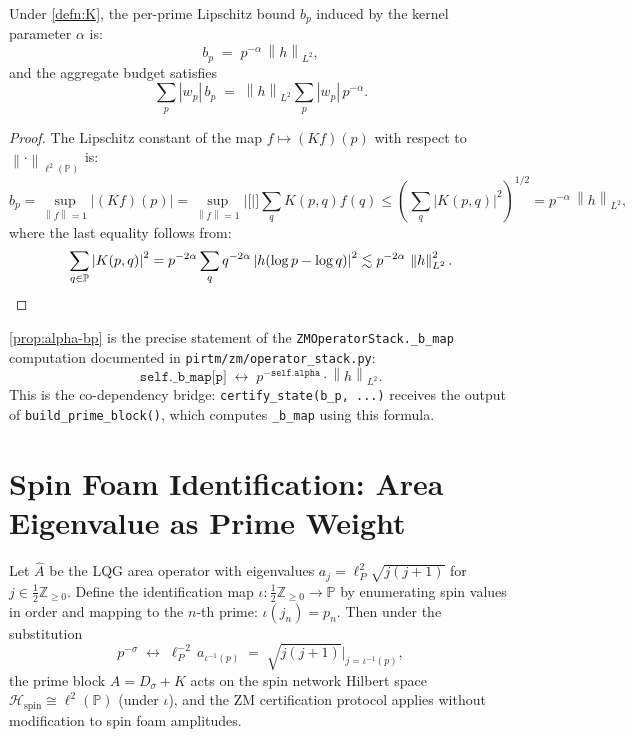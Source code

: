 \documentclass[12pt,letterpaper]{article}
\theoremstyle{definition}
\theoremstyle{remark}
\newcommand{\PP}{\mathbb{P}}
\newcommand{\ZZ}{\mathbb{Z}}
\newcommand{\norm}[1]{\left\|#1\right\|}
\newcommand{\abs}[1]{\left|#1\right|}
\newcommand{\lp}{\ell^2(\PP)}
\begin{document}
\begin{appproposition}
\label{prop:alpha-bp}
Under \cref{defn:K}, the per-prime Lipschitz bound $b_p$ induced by the
kernel parameter $\alpha$ is:
\[
  b_p \;=\; p^{-\alpha}\, \norm{h}_{L^2},
\]
and the aggregate budget satisfies
\[
  \sum_p \abs{w_p}\, b_p
  \;=\;
  \norm{h}_{L^2} \sum_p \abs{w_p}\, p^{-\alpha}.
\]
\end{appproposition}

\begin{proof}
The Lipschitz constant of the map $f \mapsto (Kf)(p)$ with respect to
$\norm{\cdot}_{\lp}$ is:
\[
  b_p
  = \sup_{\norm{f} = 1} \abs{(Kf)(p)}
  = \sup_{\norm{f} = 1} \abs[\Big]{\sum_q K(p,q) f(q)}
  \leq \left(\sum_q \abs{K(p,q)}^2\right)^{1/2}
  = p^{-\alpha}\, \norm{h}_{L^2},
\]
where the last equality follows from:
\[
  \sum_{q \in \PP} \abs{K(p,q)}^2
  = p^{-2\alpha} \sum_q q^{-2\alpha} \abs{h(\log p - \log q)}^2
  \lesssim p^{-2\alpha}\, \norm{h}_{L^2}^2. \qedhere
\]
\end{proof}

\begin{appremark}
\cref{prop:alpha-bp} is the precise statement of the
\texttt{ZMOperatorStack.\_b\_map} computation documented in
\texttt{pirtm/zm/operator\_stack.py}:
\[
  \texttt{self.\_b\_map[p]}
  \;\longleftrightarrow\;
  p^{-\texttt{self.alpha}} \cdot \norm{h}_{L^2}.
\]
This is the co-dependency bridge: \texttt{certify\_state(b\_p, ...)} receives
the output of \texttt{build\_prime\_block()}, which computes
\texttt{\_b\_map} using this formula.
\end{appremark}

\section{Spin Foam Identification: Area Eigenvalue as Prime Weight}
\label{app:spinfoam}

\begin{appproposition}
\label{prop:spinfoam}
Let $\hat{A}$ be the LQG area operator with eigenvalues
$a_j = \ell_P^2 \sqrt{j(j+1)}$ for $j \in \tfrac{1}{2}\ZZ_{\geq 0}$.
Define the identification map $\iota \colon \tfrac{1}{2}\ZZ_{\geq 0} \to \PP$
by enumerating spin values in order and mapping to the $n$-th prime:
$\iota(j_n) = p_n$. Then under the substitution
\[
  p^{-\sigma}
  \;\longleftrightarrow\;
  \ell_P^{-2}\, a_{\iota^{-1}(p)}
  \;=\;
  \sqrt{j(j+1)}\big|_{j = \iota^{-1}(p)},
\]
the prime block $A = D_\sigma + K$ acts on the spin network Hilbert space
$\mathcal{H}_{\mathrm{spin}} \cong \lp$ (under $\iota$), and the ZM
certification protocol applies without modification to spin foam amplitudes.
\end{appproposition}
\end{document}
